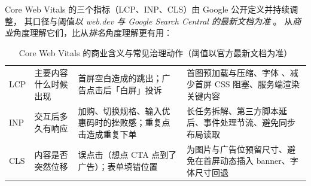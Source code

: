 Core Web Vitals 的三个指标（LCP、INP、CLS）由 Google 公开定义并持续调整，
其口径与阈值\emph{以 web.dev 与 Google Search Central 的最新文档为准} \cite{google2024corewebvitals}。
从\emph{商业}角度理解它们，比从\emph{排名}角度理解更有用：

\begin{table}[htbp]
\centering
\caption{Core Web Vitals 的商业含义与常见治理动作（阈值以官方最新文档为准）}
\label{tab:cwv-biz}
\small
\begin{tabularx}{\textwidth}{L{1.5cm} L{3.0cm} L{3.4cm} Y}
\toprule
{} &  &  &  \\
\midrule
LCP & 主要内容什么时候出现 & 首屏空白造成的跳出；广告点击后「白屏」投诉 & 首图预加载与压缩、字体 、减少首屏 CSS 阻塞、服务端渲染关键内容 \\
\addlinespace
INP & 交互后多久有响应 & 加购、切换规格、输入优惠码时的挫败感；重复点击造成重复下单 & 长任务拆解、第三方脚本延后、事件处理节流、避免同步布局读取 \\
\addlinespace
CLS & 内容是否突然位移 & 误点击（想点 CTA 点到了广告）；表单填错位置 & 为图片与广告位预留尺寸、避免在首屏动态插入 banner、字体尺寸回退 \\
\bottomrule
\end{tabularx}
\end{table}

